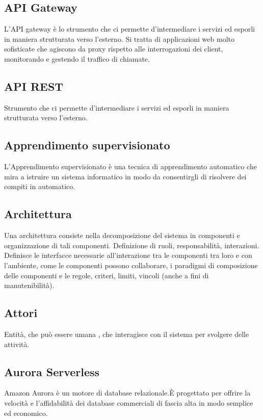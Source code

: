 \subsection{API Gateway}
L’API gateway è lo strumento che ci permette d’intermediare i servizi  ed esporli in maniera strutturata verso l’esterno. Si tratta di applicazioni web molto sofisticate che agiscono da proxy rispetto alle interrogazioni dei client, monitorando e gestendo il traffico di chiamate.

\subsection{API REST}
Strumento che ci permette d’intermediare i servizi ed esporli in maniera strutturata verso l’esterno.

\subsection{Apprendimento supervisionato}
L'Apprendimento supervisionato è una tecnica di apprendimento automatico che mira a istruire un sistema informatico in modo da consentirgli di risolvere dei compiti in automatico.

\subsection{Architettura}
Una architettura consiste nella decomposizione del sistema in componenti e organizzazione di tali componenti. Definizione di ruoli, responsabilità, interazioni. Definisce le interfacce necessarie all’interazione tra le componenti tra loro e con l’ambiente, come le componenti possono collaborare, i paradigmi di composizione delle componenti  e le regole, criteri, limiti, vincoli (anche a fini di manutenibilità).


\subsection{Attori}
Entità, che può essere umana , che interagisce con il sistema per svolgere delle attività.


\subsection{Aurora Serverless}
Amazon Aurora è un motore di database relazionale.È progettato per offrire la velocità e l'affidabilità dei database commerciali di fascia alta in modo semplice ed economico. 


